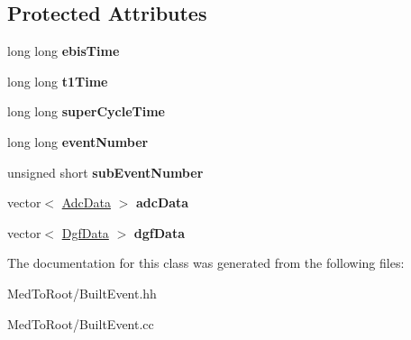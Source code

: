 \subsection*{Protected Attributes}
\begin{DoxyCompactItemize}
\item 
\hypertarget{class_built_event_a03d3a46cd8ffa584750f814895a36719}{long long {\bfseries ebis\-Time}}\label{class_built_event_a03d3a46cd8ffa584750f814895a36719}

\item 
\hypertarget{class_built_event_a7a57667e365324e20b3cd27411bf27a4}{long long {\bfseries t1\-Time}}\label{class_built_event_a7a57667e365324e20b3cd27411bf27a4}

\item 
\hypertarget{class_built_event_af4382a0a57b77db32d3934fa2764109f}{long long {\bfseries super\-Cycle\-Time}}\label{class_built_event_af4382a0a57b77db32d3934fa2764109f}

\item 
\hypertarget{class_built_event_a2492458c6571f5bbbb4d4083b380bf33}{long long {\bfseries event\-Number}}\label{class_built_event_a2492458c6571f5bbbb4d4083b380bf33}

\item 
\hypertarget{class_built_event_aee8cf8caf851007431c754ae7a176d01}{unsigned short {\bfseries sub\-Event\-Number}}\label{class_built_event_aee8cf8caf851007431c754ae7a176d01}

\item 
\hypertarget{class_built_event_adeb272a29e4b64150197eb14d8f99d9c}{vector$<$ \hyperlink{class_adc_data}{Adc\-Data} $>$ {\bfseries adc\-Data}}\label{class_built_event_adeb272a29e4b64150197eb14d8f99d9c}

\item 
\hypertarget{class_built_event_acec847a035bef94b9820e31d1d1468ee}{vector$<$ \hyperlink{class_dgf_data}{Dgf\-Data} $>$ {\bfseries dgf\-Data}}\label{class_built_event_acec847a035bef94b9820e31d1d1468ee}

\end{DoxyCompactItemize}


The documentation for this class was generated from the following files\-:\begin{DoxyCompactItemize}
\item 
Med\-To\-Root/Built\-Event.\-hh\item 
Med\-To\-Root/Built\-Event.\-cc\end{DoxyCompactItemize}
